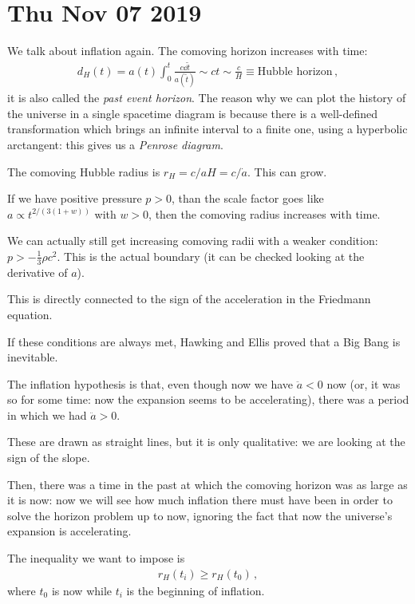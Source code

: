 \documentclass[main.tex]{subfiles}
\begin{document}
\section*{Thu Nov 07 2019}

We talk about inflation again.
The comoving horizon increases with time: 
%
\begin{align}
  d_H (t) = a(t) \int_0^t \frac{c \dd{\widetilde{t}}}{a(\widetilde{t})} \sim ct \sim \frac{c}{H} \equiv \text{Hubble horizon}
\,,
\end{align}
%
it is also called the \emph{past event horizon}.
The reason why we can plot the history of the universe in a single spacetime diagram is because there is a well-defined transformation which brings an infinite interval to a finite one, using a hyperbolic arctangent: this gives us a \emph{Penrose diagram}.

The comoving Hubble radius is \(r_H = c / aH = c/ \dot{a}\). This can grow.

If we have positive pressure \(p>0\), than the scale factor goes like \(a \propto t^{2/(3(1+w))}\) with \(w>0\), then the comoving radius increases with time.

We can actually still get increasing comoving radii with a weaker condition: \(p> -\frac{1}{3} \rho c^2\). This is the actual boundary (it can be checked looking at the derivative of \(a\)).

This is directly connected to the sign of the acceleration in the Friedmann equation.

If these conditions are always met, Hawking and Ellis proved that a Big Bang is inevitable. 

The inflation hypothesis is that, even though now we have \(\ddot{a}<0\) now (or, it was so for some time: now the expansion seems to be accelerating), there was a period in which we had \(\ddot{a}>0\).

These are drawn as straight lines, but it is only qualitative: we are looking at the sign of the slope.

Then, there was a time in the past at which the comoving horizon was as large as it is now: now we will see how much inflation there must have been in order to solve the horizon problem up to now, ignoring the fact that now the universe's expansion is accelerating.

The inequality we want to impose is 
%
\begin{align}
  r_H (t_i) \geq r_H (t_0 )
\,,
\end{align}
%
where \(t_0 \) is now while \(t_i\) is the beginning of inflation.
\end{document}
